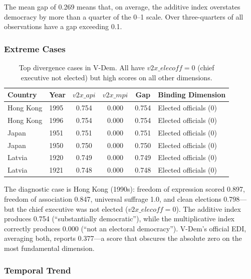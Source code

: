 \documentclass[12pt]{article}
\begin{document}
The mean gap of 0.269 means that, on average, the additive index overstates democracy by more than a quarter of the 0--1 scale. Over three-quarters of all observations have a gap exceeding 0.1.

\subsubsection{Extreme Cases}

\begin{table}[h]
\centering
\small
\begin{tabular}{@{}llcccl@{}}
\toprule
Country & Year & $v2x\_api$ & $v2x\_mpi$ & Gap & Binding Dimension \\
\midrule
Hong Kong & 1995 & 0.754 & 0.000 & 0.754 & Elected officials (0) \\
Hong Kong & 1996 & 0.754 & 0.000 & 0.754 & Elected officials (0) \\
Japan & 1951 & 0.751 & 0.000 & 0.751 & Elected officials (0) \\
Japan & 1950 & 0.750 & 0.000 & 0.750 & Elected officials (0) \\
Latvia & 1920 & 0.749 & 0.000 & 0.749 & Elected officials (0) \\
Latvia & 1921 & 0.748 & 0.000 & 0.748 & Elected officials (0) \\
\bottomrule
\end{tabular}
\caption{Top divergence cases in V-Dem. All have $v2x\_elecoff = 0$ (chief executive not elected) but high scores on all other dimensions.}
\label{tab:vdem_extreme}
\end{table}

The diagnostic case is Hong Kong (1990s): freedom of expression scored 0.897, freedom of association 0.847, universal suffrage 1.0, and clean elections 0.798---but the chief executive was not elected ($v2x\_elecoff = 0$). The additive index produces 0.754 (``substantially democratic''), while the multiplicative index correctly produces 0.000 (``not an electoral democracy''). V-Dem's official EDI, averaging both, reports 0.377---a score that obscures the absolute zero on the most fundamental dimension.

\subsubsection{Temporal Trend}
\end{document}
